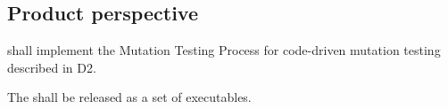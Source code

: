 \subsection{Product perspective}





\RQ{} \FAQAS shall implement the Mutation Testing Process for code-driven mutation testing described in D2.


\RQ{} The \FAQAS shall be released as a set of executables.






